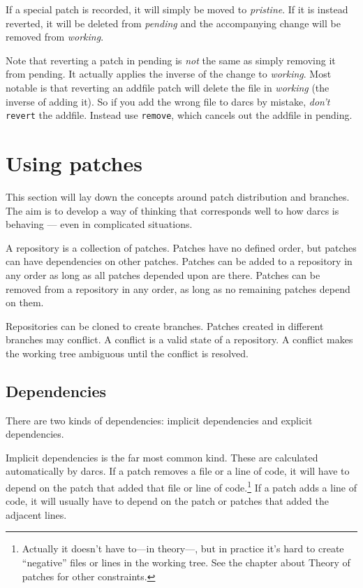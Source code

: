 If a special patch is recorded, it will simply be moved to \emph{pristine}.
If it is instead reverted, it will be deleted from \emph{pending}
and the accompanying change will be removed from \emph{working}.

Note that reverting a patch in pending is \emph{not} the same as
simply removing it from pending.
It actually applies the inverse of the change to \emph{working}.
Most notable is that reverting an addfile patch
will delete the file in \emph{working} (the inverse of adding it).
So if you add the wrong file to darcs by mistake,
\emph{don't} \verb!revert! the addfile.
Instead use \verb!remove!, which cancels out the addfile in pending.


\section{Using patches} %

This section will lay down the concepts around patch distribution and branches.
The aim is to develop a way of thinking
that corresponds well to how darcs is behaving
--- even in complicated situations.

A repository is a collection of patches.
Patches have no defined order,
but patches can have dependencies on other patches.
Patches can be added to a repository in any order
as long as all patches depended upon are there.
Patches can be removed from a repository in any order,
as long as no remaining patches depend on them.

Repositories can be cloned to create branches.
Patches created in different branches may conflict.
A conflict is a valid state of a repository.
A conflict makes the working tree ambiguous until the conflict is resolved.


\subsection{Dependencies}

There are two kinds of dependencies:
implicit dependencies and explicit dependencies.

Implicit dependencies is the far most common kind.
These are calculated automatically by darcs.
If a patch removes a file or a line of code,
it will have to depend on the patch that added that file or line of code.\footnote{%
Actually it doesn't have to---in theory---,
but in practice it's hard to create ``negative'' files or lines in the working tree.
See the chapter about Theory of patches for other constraints.}
If a patch adds a line of code,
it will usually have to depend on the patch or patches that added the adjacent lines.

